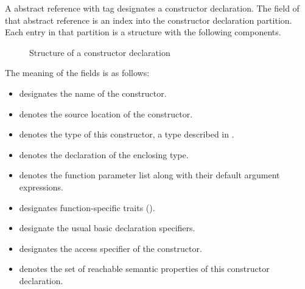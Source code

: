 A  abstract reference with tag  designates a constructor declaration.
The  field of that abstract reference is an index into the constructor declaration partition.
Each entry in that partition is a structure with the following components.
%
\begin{figure}[H]
	\centering
	\caption{Structure of a constructor declaration}
	\label{fig:ifc-constructor-decl-structure}
\end{figure}
%
The meaning of the fields is as follows:
\begin{itemize}
	\item {} designates the name of the constructor.
	\item {} denotes the source location of the constructor.
	\item {} denotes the type of this constructor, a type described in .
	\item {} denotes the declaration of the enclosing type.
	\item {} denotes the function parameter list along with their default argument expressions.
	\item {} designates function-specific traits ().
	\item {} designate the usual basic declaration specifiers.
	\item {} designates the access specifier of the constructor.
	\item {} denotes the set of reachable semantic properties of this constructor declaration.
\end{itemize}

